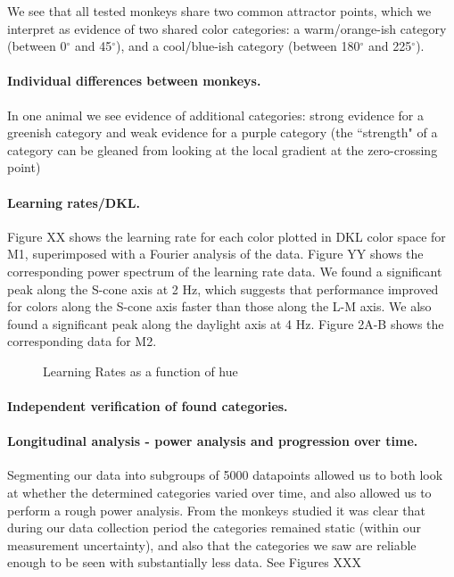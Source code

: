 We see that all tested monkeys share two common attractor points, which we interpret as evidence of two shared color categories: a warm/orange-ish category (between 0$^\circ$ and 45$^\circ$), and a cool/blue-ish category (between 180$^\circ$ and 225$^\circ$).

\paragraph{Individual differences between monkeys.}

In one animal we see evidence of additional categories: strong evidence for a greenish category and weak evidence for a purple category (the ``strength" of a category can be gleaned from looking at the local gradient at the zero-crossing point)



\paragraph{Learning rates/DKL.}

Figure XX shows the learning rate for each color plotted in DKL color space for M1, superimposed with a Fourier analysis of the data. Figure YY shows the corresponding power spectrum of the learning rate data. We found a significant peak along the S-cone axis at 2 Hz, which suggests that performance improved for colors along the S-cone axis faster than those along the L-M axis. We also found a significant peak along the daylight axis at 4 Hz. Figure 2A-B shows the corresponding data for M2.


\begin{figure}

\caption{Learning Rates as a function of hue}
\label{fig:LearningRates}
\end{figure}

\paragraph{Independent verification of found categories.}

\paragraph{Longitudinal analysis - power analysis and progression over time.}

Segmenting our data into subgroups of 5000 datapoints allowed us to both look at whether the determined categories varied over time, and also allowed us to perform a rough power analysis. From the monkeys studied it was clear that during our data collection period the categories remained static (within our measurement uncertainty), and also that the categories we saw are reliable enough to be seen with substantially less data. See Figures XXX %




